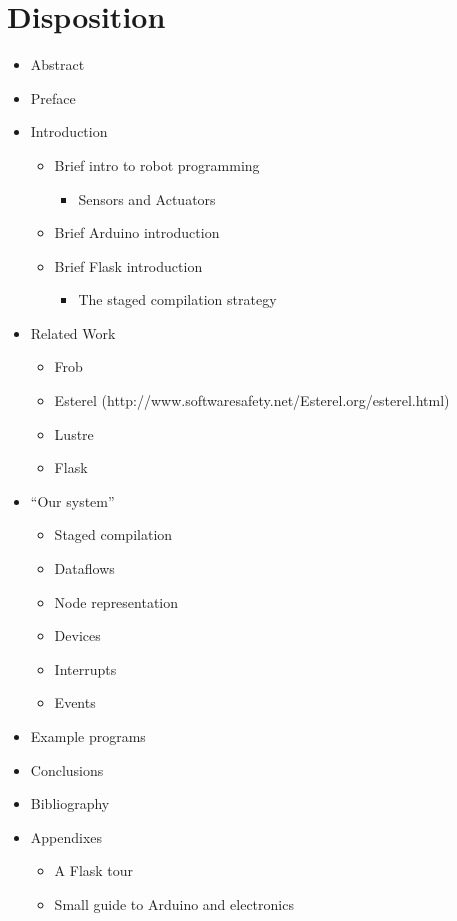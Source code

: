 \documentclass[a4paper, oneside, draft]{memoir}
\begin{document}
\section{Disposition}
\begin{itemize}
\item Abstract

\item Preface

\item Introduction
  \begin{itemize}
  \item Brief intro to robot programming
    \begin{itemize}
     \item Sensors and Actuators
    \end{itemize}
  \item Brief Arduino introduction
  \item Brief Flask introduction
    \begin{itemize}
     \item The staged compilation strategy
    \end{itemize}
  \end{itemize}

\item Related Work
  \begin{itemize}
  \item Frob
  \item Esterel
    (http://www.softwaresafety.net/Esterel.org/esterel.html)
  \item Lustre \cite{lustre91}
  \item Flask
  \end{itemize}

\item "`Our system"'
  \begin{itemize}
  \item Staged compilation
  \item Dataflows
  \item Node representation
  \item Devices
  \item Interrupts
  \item Events
  \end{itemize}

\item Example programs

\item Conclusions

\item Bibliography

\item Appendixes
  \begin{itemize}
  \item A Flask tour
  \item Small guide to Arduino and electronics
  \end{itemize}
\end{itemize}  
\end{document}
